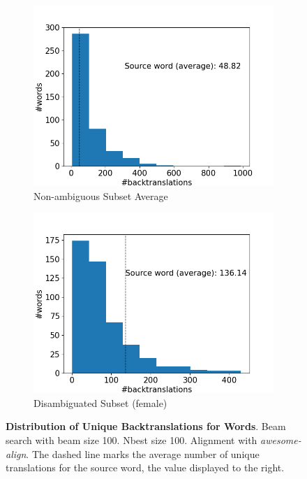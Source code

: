 \begin{figure}[!htb]
\begin{subfigure}{0.49\textwidth}
     \end{subfigure}
     \begin{subfigure}{0.49\textwidth}
         \centering
         \includegraphics[width=\textwidth]{figures/alignment/align_100/word_backtranslations_average.png}
         \caption{Non-ambiguous Subset Average}
     \end{subfigure}
     \hfill
     \begin{subfigure}{0.49\textwidth}
         \centering
         \includegraphics[width=\textwidth]{figures/alignment/align_100/word_backtranslations_female.png}
         \caption{Disambiguated Subset (female)}
     \end{subfigure}
        \caption{\textbf{Distribution of Unique Backtranslations for Words}. Beam search with beam size 100. Nbest size 100. Alignment with \textit{awesome-align}. The dashed line marks the average number of unique translations for the source word, the value displayed to the right.}
        \label{fig:alignment_graphs_backtranslation_100}

\end{figure}

